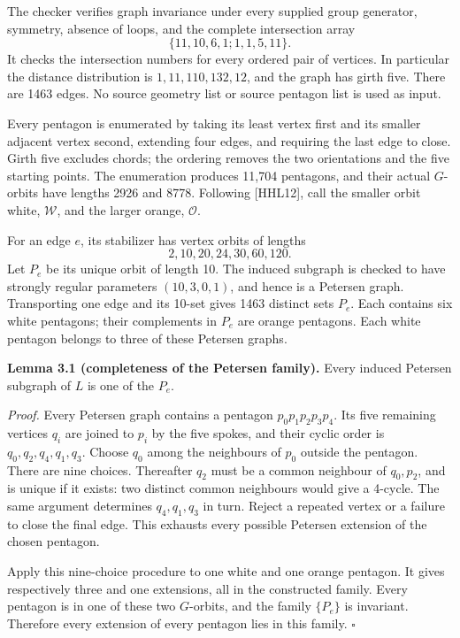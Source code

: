 The checker verifies graph invariance under every supplied group
generator, symmetry, absence of loops, and the complete intersection
array \[
 \{11,10,6,1;1,1,5,11\}.
\] It checks the intersection numbers for every ordered pair of
vertices. In particular the distance distribution is
\(1,11,110,132,12\), and the graph has girth five. There are 1463 edges.
No source geometry list or source pentagon list is used as input.

Every pentagon is enumerated by taking its least vertex first and its
smaller adjacent vertex second, extending four edges, and requiring the
last edge to close. Girth five excludes chords; the ordering removes the
two orientations and the five starting points. The enumeration produces
11,704 pentagons, and their actual \(G\)-orbits have lengths 2926 and
8778. Following {[}HHL12{]}, call the smaller orbit white,
\(\mathcal W\), and the larger orange, \(\mathcal O\).

For an edge \(e\), its stabilizer has vertex orbits of lengths \[
 2,10,20,24,30,60,120.
\] Let \(P_e\) be its unique orbit of length 10. The induced subgraph is
checked to have strongly regular parameters \((10,3,0,1)\), and hence is
a Petersen graph. Transporting one edge and its 10-set gives 1463
distinct sets \(P_e\). Each contains six white pentagons; their
complements in \(P_e\) are orange pentagons. Each white pentagon belongs
to three of these Petersen graphs.

\textbf{Lemma 3.1 (completeness of the Petersen family).} Every induced
Petersen subgraph of \(L\) is one of the \(P_e\).

\emph{Proof.} Every Petersen graph contains a pentagon
\(p_0p_1p_2p_3p_4\). Its five remaining vertices \(q_i\) are joined to
\(p_i\) by the five spokes, and their cyclic order is
\(q_0,q_2,q_4,q_1,q_3\). Choose \(q_0\) among the neighbours of \(p_0\)
outside the pentagon. There are nine choices. Thereafter \(q_2\) must be
a common neighbour of \(q_0,p_2\), and is unique if it exists: two
distinct common neighbours would give a 4-cycle. The same argument
determines \(q_4,q_1,q_3\) in turn. Reject a repeated vertex or a
failure to close the final edge. This exhausts every possible Petersen
extension of the chosen pentagon.

Apply this nine-choice procedure to one white and one orange pentagon.
It gives respectively three and one extensions, all in the constructed
family. Every pentagon is in one of these two \(G\)-orbits, and the
family \(\{P_e\}\) is invariant. Therefore every extension of every
pentagon lies in this family. \(\square\)

